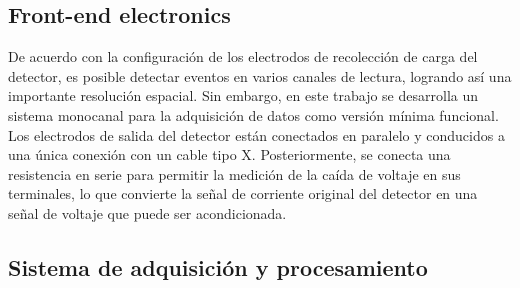 \documentclass[]{book}
\begin{document}
\subsection*{Front-end electronics}

\noindent De acuerdo con la configuración de los electrodos de recolección de carga del detector, es posible detectar eventos en varios canales de lectura, logrando así una importante resolución espacial. Sin embargo, en este trabajo se desarrolla un sistema monocanal para la adquisición de datos como versión mínima funcional. Los electrodos de salida del detector están conectados en paralelo y conducidos a una única conexión con un cable tipo X. Posteriormente, se conecta una resistencia en serie para permitir la medición de la caída de voltaje en sus terminales, lo que convierte la señal de corriente original del detector en una señal de voltaje que puede ser acondicionada.


\subsection*{Sistema de adquisición y procesamiento}

\noindent 
\end{document}
